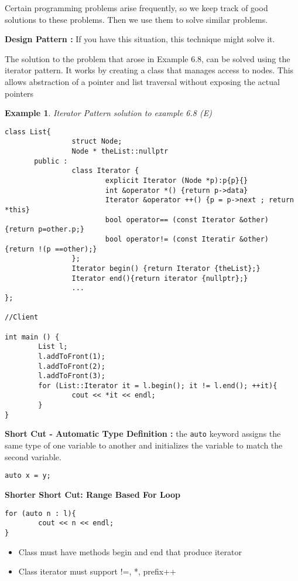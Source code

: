\documentclass{article}
\newtheorem{ex}[theorem]{Example}
\newenvironment{ablock}[1]{%
    \tcolorbox[beamer,%
    noparskip,breakable,
    colback=lightcoral,colframe=darkred,%
    colbacklower=tomato!75!lightcoral,%
    title=#1]}%
    {\endtcolorbox}
\begin{document}
\begin{ablock}{Software Engineering Topic : Design Patterns}
Certain programming problems arise frequently, so we keep track of good solutions to these problems. Then we use them to solve similar problems. 

\textbf{Design Pattern : } If you have this situation, this technique might solve it. 
\end{ablock}

The solution to the problem that arose in Example 6.8, can be solved using the iterator pattern. It works by creating a class that manages access to nodes. This allows abstraction of a pointer and list traversal without exposing the actual pointers

\begin{ex} Iterator Pattern solution to example 6.8 \textit{(E)}
\begin{lstlisting}
class List{
				struct Node;
				Node * theList::nullptr
	   public :
	   			class Iterator {
	   					explicit Iterator (Node *p):p{p}{}
	   					int &operator *() {return p->data}
	   					Iterator &operator ++() {p = p->next ; return *this}
	   					bool operator== (const Iterator &other) {return p=other.p;}
	   					bool operator!= (const Iteratir &other) {return !(p ==other);}
	   			};
	   			Iterator begin() {return Iterator {theList};}
	   			Iterator end(){return iterator {nullptr};}
	   			...
};

//Client 

int main () {
		List l;
		l.addToFront(1);
		l.addToFront(2);
		l.addToFront(3);
		for (List::Iterator it = l.begin(); it != l.end(); ++it){
				cout << *it << endl;
		}
}					
\end{lstlisting}
\end{ex}

\textbf{Short Cut - Automatic Type Definition : } the \verb|auto| keyword assigns the same type of one variable to another and initializes the variable to match the second variable.  
\begin{lstlisting}
auto x = y; 
\end{lstlisting}


\textbf{Shorter Short Cut: Range Based For Loop}
\begin{lstlisting}
for (auto n : l){
		cout << n << endl;
}
\end{lstlisting}
\begin{itemize}
\item Class must have methods begin and end that produce iterator 
\item Class iterator must support !=,  *, prefix++
\end{itemize}
\end{document}
